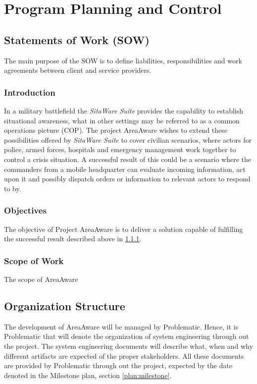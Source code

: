 %
\thispagestyle{fancy}
\chapter{Program Planning and Control}
\label{chp:program_plan}


\section{Statements of Work (SOW)}
The main purpose of the SOW is to define liabilities, responsibilities and work agreements between client and service providers.

\subsection{Introduction}
\label{sec:sow_intro}
In a military battlefield the \emph{SitaWare Suite} provides the capability to establish situational awareness, what in other settings may be referred to as a common operations picture (COP).
The project AreaAware wishes to extend these possibilities offered by \emph{SitaWare Suite} to cover civilian scenarios, where actors for police, armed forces, hospitals and emergency management work together to control a crisis situation.
A successful result of this could be a scenario where the commanders from a mobile headquarter can evaluate incoming information, act upon it and possibly dispatch orders or information to relevant actors to respond to by.

\subsection{Objectives}
The objective of Project AreaAware is to deliver a solution capable of fulfilling the successful result described above in \ref{sec:sow_intro}.

\subsection{Scope of Work}
The scope of AreaAware



\section{Organization Structure}
The development of AreaAware will be managed by Problematic.
Hence, it is Problematic that will denote the organization of system engineering through out the project.
The system engineering documents will describe what, when and why different artifacts are expected of the proper stakeholders.
All these documents are provided by Problematic through out the project, expected by the date denoted in the Milestone plan, section \ref{plan:milestone}.\\


